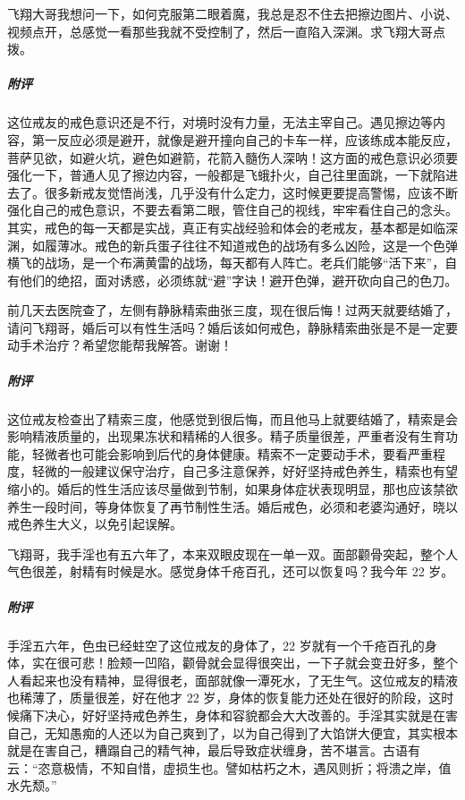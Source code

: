 \begin{case}
    飞翔大哥我想问一下，如何克服第二眼着魔，我总是忍不住去把擦边图片、小说、视频点开，总感觉一看那些我就不受控制了，然后一直陷入深渊。求飞翔大哥点拨。
    \subparagraph{附评} 这位戒友的戒色意识还是不行，对境时没有力量，无法主宰自己。遇见擦边等内容，第一反应必须是避开，就像是避开撞向自己的卡车一样，应该练成本能反应，菩萨见欲，如避火坑，避色如避箭，花箭入髓伤人深呐！这方面的戒色意识必须要强化一下，普通人见了擦边内容，一般都是飞蛾扑火，自己往里面跳，一下就陷进去了。很多新戒友觉悟尚浅，几乎没有什么定力，这时候更要提高警惕，应该不断强化自己的戒色意识，不要去看第二眼，管住自己的视线，牢牢看住自己的念头。其实，戒色的每一天都是实战，真正有实战经验和体会的老戒友，基本都是如临深渊，如履薄冰。戒色的新兵蛋子往往不知道戒色的战场有多么凶险，这是一个色弹横飞的战场，是一个布满黄雷的战场，每天都有人阵亡。老兵们能够“活下来”，自有他们的绝招，面对诱惑，必须练就“避”字诀！避开色弹，避开砍向自己的色刀。
\end{case}

\begin{case}
    前几天去医院查了，左侧有静脉精索曲张三度，现在很后悔！过两天就要结婚了，请问飞翔哥，婚后可以有性生活吗？婚后该如何戒色，静脉精索曲张是不是一定要动手术治疗？希望您能帮我解答。谢谢！
    \subparagraph{附评} 这位戒友检查出了精索三度，他感觉到很后悔，而且他马上就要结婚了，精索是会影响精液质量的，出现果冻状和精稀的人很多。精子质量很差，严重者没有生育功能，轻微者也可能会影响到后代的身体健康。精索不一定要动手术，要看严重程度，轻微的一般建议保守治疗，自己多注意保养，好好坚持戒色养生，精索也有望缩小的。婚后的性生活应该尽量做到节制，如果身体症状表现明显，那也应该禁欲养生一段时间，等身体恢复了再节制性生活。婚后戒色，必须和老婆沟通好，晓以戒色养生大义，以免引起误解。
\end{case}

\begin{case}
    飞翔哥，我手淫也有五六年了，本来双眼皮现在一单一双。面部颧骨突起，整个人气色很差，射精有时候是水。感觉身体千疮百孔，还可以恢复吗？我今年 22 岁。
    \subparagraph{附评} 手淫五六年，色虫已经蛀空了这位戒友的身体了，22 岁就有一个千疮百孔的身体，实在很可悲！脸颊一凹陷，颧骨就会显得很突出，一下子就会变丑好多，整个人看起来也没有精神，显得很老，面部就像一潭死水，了无生气。这位戒友的精液也稀薄了，质量很差，好在他才 22 岁，身体的恢复能力还处在很好的阶段，这时候痛下决心，好好坚持戒色养生，身体和容貌都会大大改善的。手淫其实就是在害自己，无知愚痴的人还以为自己爽到了，以为自己得到了大馅饼大便宜，其实根本就是在害自己，糟蹋自己的精气神，最后导致症状缠身，苦不堪言。古语有云：“恣意极情，不知自惜，虚损生也。譬如枯朽之木，遇风则折；将溃之岸，值水先颓。”
\end{case}

